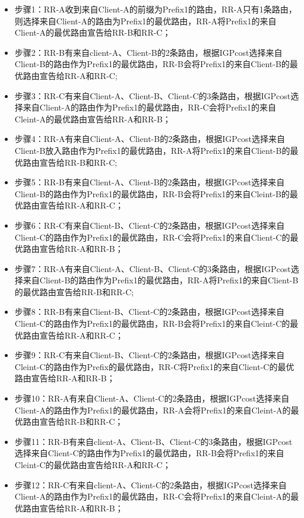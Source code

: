 \begin{itemize}
\item 步骤1：RR-A收到来自Client-A的前缀为Prefix1的路由，RR-A只有1条路由，则选择来自Client-A的路由为Prefix1的最优路由，RR-A将Prefix1的来自Client-A的最优路由宣告给RR-B和RR-C；
\item 步骤2：RR-B有来自client-A、Client-B的2条路由，根据IGPcost选择来自Client-B的路由作为Prefix1的最优路由，RR-B会将Prefix1的来自Client-B的最优路由宣告给RR-A和RR-C;
\item 步骤3：RR-C有来自Client-A、Client-B、Client-C的3条路由，根据IGPcost选择来自Client-A的路由作为Prefix1的最优路由，RR-C会将Prefix1的来自Cleint-A的最优路由宣告给RR-A和RR-B；


\item 步骤4：RR-A有来自Client-A、Client-B的2条路由，根据IGPcost选择来自Client-B放入路由作为Prefix1的最优路由，RR-A将Prefix1的来自Client-B的最优路由宣告给RR-B和RR-C;
\item 步骤5：RR-B有来自Client-A、Client-B的2条路由，根据IGPcost选择来自Client-B的路由作为Prefix1的最优路由，RR-B会将Prefix1的来自Cleint-B的最优路由宣告给RR-A和RR-C；
\item 步骤6：RR-C有来自Client-B、Client-C的2条路由，根据IGPcost选择来自Client-C的路由作为Prefix1的最优路由，RR-C会将Prefix1的来自Client-C的最优路由宣告给RR-A和RR-B；


\item 步骤7：RR-A有来自Client-A、Client-B、Client-C的3条路由，根据IGPcost选择来自Client-B的路由作为Prefix1的最优路由，RR-A将Prefix1的来自Client-B的最优路由宣告给RR-B和RR-C;
\item 步骤8：RR-B有来自Client-B、Client-C的2条路由，根据IGPcost选择来自Client-C的路由作为Prefix1的最优路由，RR-B会将Prefix1的来自Cleint-C的最优路由宣告给RR-A和RR-C；
\item 步骤9：RR-C有来自Client-B、Client-C的2条路由，根据IGPcost选择来自Cleint-C的路由作为Prefix的最优路由，RR-C将Prefix1的来自Client-C的最优路由宣告给RR-A和RR-B；


\item 步骤10：RR-A有来自Client-A、Client-C的2条路由，根据IGPcost选择来自Client-A的路由作为Prefix1的最优路由，RR-A会将Prefix1的来自Cleint-A的最优路由宣告给RR-B和RR-C；
\item 步骤11：RR-B有来自client-A、Client-B、Client-C的3条路由，根据IGPcost选择来自Client-C的路由作为Prefix1的最优路由，RR-B会将Prefix1的来自Cleint-C的最优路由宣告给RR-A和RR-C；
\item 步骤12：RR-C有来自client-A、Client-C的2条路由，根据IGPcost选择来自Client-A的路由作为Prefix1的最优路由，RR-C会将Prefix1的来自Cleint-A的最优路由宣告给RR-A和RR-B；



\end{itemize}
